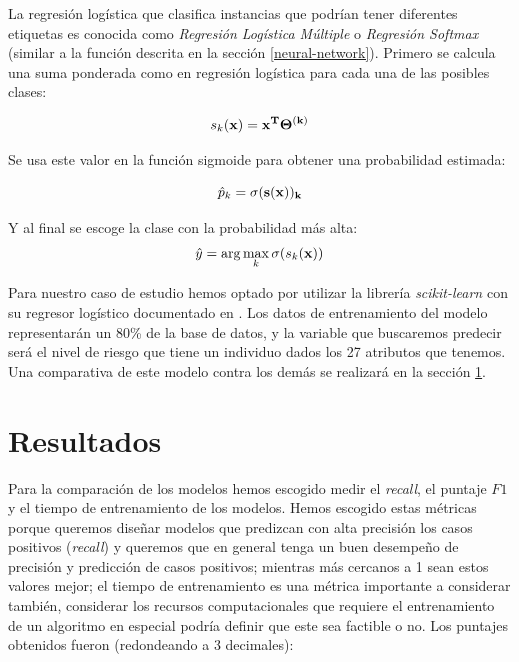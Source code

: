 \documentclass[journal]{IEEEtran}                                                          %
\begin{document}
                La regresión logística que clasifica instancias que podrían tener diferentes etiquetas es conocida como \emph{Regresión Logística Múltiple} o \emph{Regresión Softmax} (similar a la función descrita en la sección \ref{neural-network}). Primero se calcula una suma ponderada como en regresión logística para cada una de las posibles clases:

                \begin{equation}
                    s_k(\bf{x}) = \bf{x}^T \Theta^{(k)}
                \end{equation}

                Se usa este valor en la función sigmoide para obtener una probabilidad estimada:

                \begin{equation}
                    \hat{p}_k = \sigma(\bf{s}(\bf{x}))_k
                \end{equation}

                Y al final se escoge la clase con la probabilidad más alta:
                \begin{equation}
                    \hat{y} = \arg\max_k \sigma(s_k(\bf{x}))
                \end{equation}
            
            Para nuestro caso de estudio hemos optado por utilizar la librería \emph{scikit-learn} con su regresor logístico documentado en \cite{sci-kit-learn-no-dateB}. Los datos de entrenamiento del modelo representarán un 80\% de la base de datos, y la variable que buscaremos predecir será el nivel de riesgo que tiene un individuo dados los 27 atributos que tenemos. Una comparativa de este modelo contra los demás se realizará en la sección \ref{resultados}.

    \section{Resultados} \label{resultados}
        
        Para la comparación de los modelos hemos escogido medir el \emph{recall}, el puntaje $F1$ y el tiempo de entrenamiento de los modelos. Hemos escogido estas métricas porque queremos diseñar modelos que predizcan con alta precisión los casos positivos (\emph{recall}) y queremos que en general tenga un buen desempeño de precisión y predicción de casos positivos; mientras más cercanos a 1 sean estos valores mejor; el tiempo de entrenamiento es una métrica importante a considerar también, considerar los recursos computacionales que requiere el entrenamiento de un algoritmo en especial podría definir que este sea factible o no. Los puntajes obtenidos fueron (redondeando a 3 decimales):
        
\end{document}
